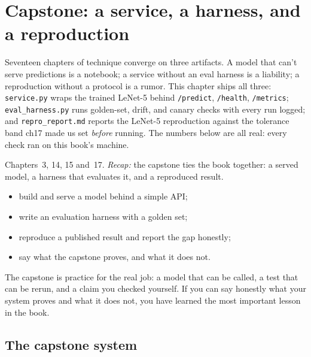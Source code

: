 \chapter{Capstone: a service, a harness, and a reproduction}
\label{ch:capstone}

Seventeen chapters of technique converge on three artifacts. A
model that can't serve predictions is a notebook; a service without
an eval harness is a liability; a reproduction without a protocol is
a rumor. This chapter ships all three: \texttt{service.py} wraps
the trained LeNet-5 behind \texttt{/predict}, \texttt{/health},
\texttt{/metrics}; \texttt{eval\_harness.py} runs golden-set,
drift, and canary checks with every run logged; and
\texttt{repro\_report.md} reports the LeNet-5 reproduction against
the tolerance band ch17 made us set \emph{before} running. The
numbers below are all real: every check ran on this book's machine.

\begin{rulebox}
Chapters~3, 14, 15 and~17. \emph{Recap:} the capstone ties the book together: a served model, a harness that evaluates it, and a reproduced result.
\end{rulebox}
\begin{wins}
\begin{itemize}
\item build and serve a model behind a simple API;
\item write an evaluation harness with a golden set;
\item reproduce a published result and report the gap honestly;
\item say what the capstone proves, and what it does not.
\end{itemize}
\end{wins}
\begin{principle}
The capstone is practice for the real job: a model that can be called, a test that can be rerun, and a claim you checked yourself. If you can say honestly what your system proves and what it does not, you have learned the most important lesson in the book.
\end{principle}

\section{The capstone system}
\label{sec:capsys}

